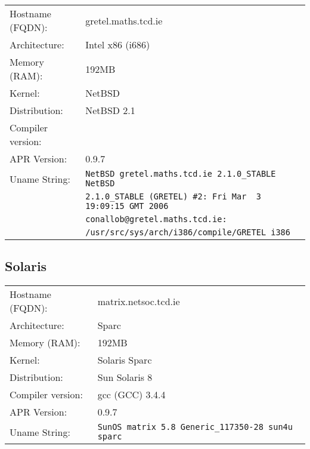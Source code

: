 \begin{tabular}{ll}
Hostname (FQDN):	&	gretel.maths.tcd.ie 				\\
Architecture:		&	Intel x86 (i686)					\\
Memory (RAM):		&	192MB									\\
Kernel:				&	NetBSD								\\
Distribution:		&	NetBSD 2.1 							\\
Compiler version:	&											\\
APR Version:		&	0.9.7									\\
Uname String:		& \verb!NetBSD gretel.maths.tcd.ie 2.1.0_STABLE NetBSD!\\
						& \verb!2.1.0_STABLE (GRETEL) #2: Fri Mar  3 19:09:15 GMT 2006! \\
						& \verb!conallob@gretel.maths.tcd.ie:!\\
						& \verb!/usr/src/sys/arch/i386/compile/GRETEL i386! \\
\end{tabular}

\subsection{Solaris}

\begin{tabular}{ll}
Hostname (FQDN):	&	matrix.netsoc.tcd.ie				\\
Architecture:		&	Sparc									\\
Memory (RAM):		&	192MB									\\
Kernel:				&	Solaris Sparc						\\
Distribution:		&	Sun Solaris 8						\\
Compiler version:	&	gcc (GCC) 3.4.4					\\
APR Version:		&	0.9.7									\\
Uname String:		& \verb!SunOS matrix 5.8 Generic_117350-28 sun4u sparc! \\
\end{tabular}

